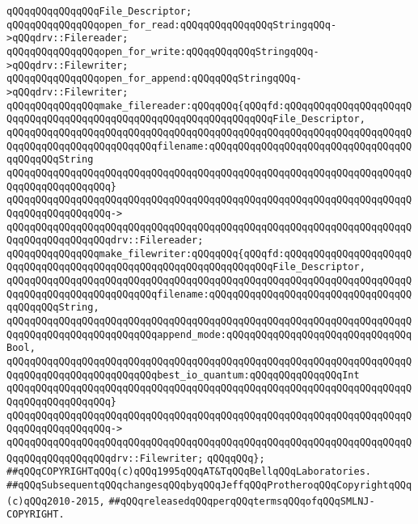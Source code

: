\newline
\verb|qQQqqQQqqQQqqQQqFile_Descriptor;|\newline
\newline
\verb|qQQqqQQqqQQqqQQqopen_for_read:qQQqqQQqqQQqqQQqStringqQQq->qQQqdrv::Filereader;|\newline
\verb|qQQqqQQqqQQqqQQqopen_for_write:qQQqqQQqqQQqStringqQQq->qQQqdrv::Filewriter;|\newline
\verb|qQQqqQQqqQQqqQQqopen_for_append:qQQqqQQqStringqQQq->qQQqdrv::Filewriter;|\newline
\newline
\verb|qQQqqQQqqQQqqQQqmake_filereader:qQQqqQQq{qQQqfd:qQQqqQQqqQQqqQQqqQQqqQQqqQQqqQQqqQQqqQQqqQQqqQQqqQQqqQQqqQQqqQQqqQQqFile_Descriptor,|\newline
\verb|qQQqqQQqqQQqqQQqqQQqqQQqqQQqqQQqqQQqqQQqqQQqqQQqqQQqqQQqqQQqqQQqqQQqqQQqqQQqqQQqqQQqqQQqqQQqqQQqfilename:qQQqqQQqqQQqqQQqqQQqqQQqqQQqqQQqqQQqqQQqqQQqString|\newline
\verb|qQQqqQQqqQQqqQQqqQQqqQQqqQQqqQQqqQQqqQQqqQQqqQQqqQQqqQQqqQQqqQQqqQQqqQQqqQQqqQQqqQQqqQQq}|\newline
\verb|qQQqqQQqqQQqqQQqqQQqqQQqqQQqqQQqqQQqqQQqqQQqqQQqqQQqqQQqqQQqqQQqqQQqqQQqqQQqqQQqqQQqqQQq->|\newline
\verb|qQQqqQQqqQQqqQQqqQQqqQQqqQQqqQQqqQQqqQQqqQQqqQQqqQQqqQQqqQQqqQQqqQQqqQQqqQQqqQQqqQQqqQQqdrv::Filereader;|\newline
\newline
\verb|qQQqqQQqqQQqqQQqmake_filewriter:qQQqqQQq{qQQqfd:qQQqqQQqqQQqqQQqqQQqqQQqqQQqqQQqqQQqqQQqqQQqqQQqqQQqqQQqqQQqqQQqqQQqFile_Descriptor,|\newline
\verb|qQQqqQQqqQQqqQQqqQQqqQQqqQQqqQQqqQQqqQQqqQQqqQQqqQQqqQQqqQQqqQQqqQQqqQQqqQQqqQQqqQQqqQQqqQQqqQQqfilename:qQQqqQQqqQQqqQQqqQQqqQQqqQQqqQQqqQQqqQQqqQQqString,|\newline
\verb|qQQqqQQqqQQqqQQqqQQqqQQqqQQqqQQqqQQqqQQqqQQqqQQqqQQqqQQqqQQqqQQqqQQqqQQqqQQqqQQqqQQqqQQqqQQqqQQqappend_mode:qQQqqQQqqQQqqQQqqQQqqQQqqQQqqQQqBool,|\newline
\verb|qQQqqQQqqQQqqQQqqQQqqQQqqQQqqQQqqQQqqQQqqQQqqQQqqQQqqQQqqQQqqQQqqQQqqQQqqQQqqQQqqQQqqQQqqQQqqQQqbest_io_quantum:qQQqqQQqqQQqqQQqInt|\newline
\verb|qQQqqQQqqQQqqQQqqQQqqQQqqQQqqQQqqQQqqQQqqQQqqQQqqQQqqQQqqQQqqQQqqQQqqQQqqQQqqQQqqQQqqQQq}|\newline
\verb|qQQqqQQqqQQqqQQqqQQqqQQqqQQqqQQqqQQqqQQqqQQqqQQqqQQqqQQqqQQqqQQqqQQqqQQqqQQqqQQqqQQqqQQq->|\newline
\verb|qQQqqQQqqQQqqQQqqQQqqQQqqQQqqQQqqQQqqQQqqQQqqQQqqQQqqQQqqQQqqQQqqQQqqQQqqQQqqQQqqQQqqQQqdrv::Filewriter;|\newline
\verb|qQQqqQQq};|\newline
\newline
\newline
\newline
\verb|##qQQqCOPYRIGHTqQQq(c)qQQq1995qQQqAT&TqQQqBellqQQqLaboratories.|\newline
\verb|##qQQqSubsequentqQQqchangesqQQqbyqQQqJeffqQQqProtheroqQQqCopyrightqQQq(c)qQQq2010-2015,|\newline
\verb|##qQQqreleasedqQQqperqQQqtermsqQQqofqQQqSMLNJ-COPYRIGHT.|\newline

